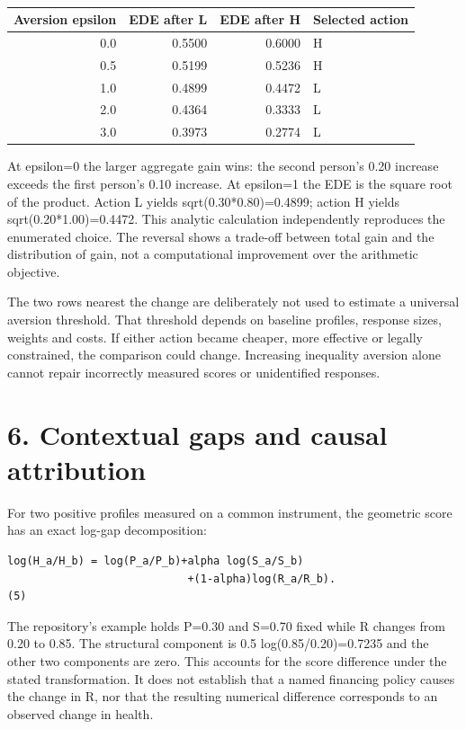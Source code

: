 \documentclass[11pt,a4paper]{article}
\begin{document}
\begin{table}[htbp]\centering\small
\caption{}
\begin{tabular}{rrrl}
\toprule
Aversion epsilon & EDE after L & EDE after H & Selected action \\
\midrule
0.0 & 0.5500 & 0.6000 & H \\
0.5 & 0.5199 & 0.5236 & H \\
1.0 & 0.4899 & 0.4472 & L \\
2.0 & 0.4364 & 0.3333 & L \\
3.0 & 0.3973 & 0.2774 & L \\
\bottomrule
\end{tabular}
\end{table}

At epsilon=0 the larger aggregate gain wins: the second person's 0.20 increase exceeds the first person's 0.10 increase. At epsilon=1 the EDE is the square root of the product. Action L yields sqrt(0.30*0.80)=0.4899; action H yields sqrt(0.20*1.00)=0.4472. This analytic calculation independently reproduces the enumerated choice. The reversal shows a trade-off between total gain and the distribution of gain, not a computational improvement over the arithmetic objective.

The two rows nearest the change are deliberately not used to estimate a universal aversion threshold. That threshold depends on baseline profiles, response sizes, weights and costs. If either action became cheaper, more effective or legally constrained, the comparison could change. Increasing inequality aversion alone cannot repair incorrectly measured scores or unidentified responses.

\section*{6. Contextual gaps and causal attribution}
For two positive profiles measured on a common instrument, the geometric score has an exact log-gap decomposition:

{\footnotesize\begin{verbatim}
log(H_a/H_b) = log(P_a/P_b)+alpha log(S_a/S_b)
                            +(1-alpha)log(R_a/R_b).                  (5)
\end{verbatim}}
The repository's example holds P=0.30 and S=0.70 fixed while R changes from 0.20 to 0.85. The structural component is 0.5 log(0.85/0.20)=0.7235 and the other two components are zero. This accounts for the score difference under the stated transformation. It does not establish that a named financing policy causes the change in R, nor that the resulting numerical difference corresponds to an observed change in health.
\end{document}
